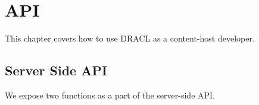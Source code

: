 \documentclass[pdftex,12pt,a4papaer,twoside,notitlepage]{report}
\begin{document}
%
%
%

\chapter{API}
\label{chap:api}

This chapter covers how to use DRACL as a content-host developer.

\section{Server Side API}

We expose two functions as a part of the server-side API.
\end{document}
